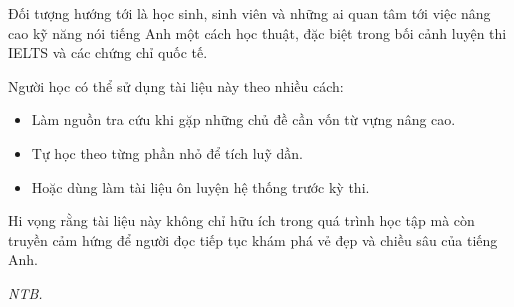 \documentclass[a4paper,12pt]{article}
\begin{document}
\vspace{3mm}
\noindent
Đối tượng hướng tới là học sinh, sinh viên và những ai quan tâm tới việc 
nâng cao kỹ năng nói tiếng Anh một cách học thuật, đặc biệt trong bối cảnh 
luyện thi IELTS và các chứng chỉ quốc tế. 


\vspace{3mm}
\noindent
Người học có thể sử dụng tài liệu này theo nhiều cách: 

\begin{itemize}
    \item Làm nguồn tra cứu khi gặp những chủ đề cần vốn từ vựng nâng cao.
    \item Tự học theo từng phần nhỏ để tích luỹ dần.
    \item Hoặc dùng làm tài liệu ôn luyện hệ thống trước kỳ thi.
\end{itemize}


 

\vspace{3mm}
\noindent
Hi vọng rằng tài liệu này không chỉ hữu ích trong quá trình 
học tập mà còn truyền cảm hứng để người đọc tiếp tục khám phá vẻ đẹp 
và chiều sâu của tiếng Anh.

\begin{flushright}
    {\emph{NTB.}}
\end{flushright}

\newpage
\clearpage
{%
  \makeatletter
  \let\ps@plain\ps@empty  %
  \makeatother
  \pagestyle{empty}       %
  \tableofcontents
}
\clearpage
\end{document}
